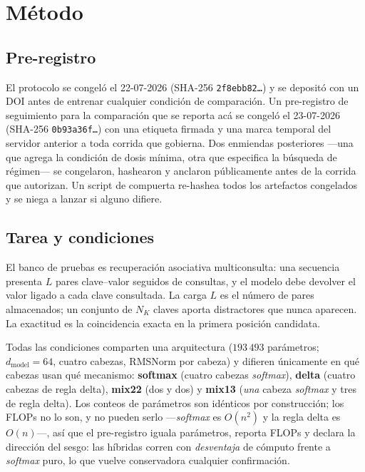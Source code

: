 \documentclass[jou,11pt,donotrepeattitle]{apa7}
\begin{document}
\section{M\'etodo}

\subsection{Pre-registro}

El protocolo se congel\'o el 22-07-2026 (SHA-256 \texttt{2f8ebb82\dots}) y se deposit\'o con un
DOI antes de entrenar cualquier condici\'on de comparaci\'on. Un pre-registro de seguimiento
para la comparaci\'on que se reporta ac\'a se congel\'o el 23-07-2026 (SHA-256
\texttt{0b93a36f\dots}) con una etiqueta firmada y una marca temporal del servidor anterior a
toda corrida que gobierna. Dos enmiendas posteriores ---una que agrega la condici\'on de dosis
m\'inima, otra que especifica la b\'usqueda de r\'egimen--- se congelaron, hashearon y anclaron
p\'ublicamente antes de la corrida que autorizan. Un script de compuerta re-hashea todos los
artefactos congelados y se niega a lanzar si alguno difiere.

\subsection{Tarea y condiciones}

El banco de pruebas es recuperaci\'on asociativa multiconsulta: una secuencia presenta $L$ pares
clave--valor seguidos de consultas, y el modelo debe devolver el valor ligado a cada clave
consultada. La carga $L$ es el n\'umero de pares almacenados; un conjunto de $N_K$ claves
aporta distractores que nunca aparecen. La exactitud es la coincidencia exacta en la primera
posici\'on candidata.

Todas las condiciones comparten una arquitectura ($193\,493$ par\'ametros;
$d_{\text{model}}=64$, cuatro cabezas, RMSNorm por cabeza) y difieren \'unicamente en qu\'e
cabezas usan qu\'e mecanismo:
\textbf{softmax} (cuatro cabezas \emph{softmax}), \textbf{delta} (cuatro cabezas de regla
delta), \textbf{mix22} (dos y dos) y \textbf{mix13} (\emph{una} cabeza \emph{softmax} y tres de
regla delta). Los conteos de par\'ametros son id\'enticos por construcci\'on; los FLOPs no lo
son, y no pueden serlo ---\emph{softmax} es $O(n^2)$ y la regla delta es $O(n)$---, as\'i que el
pre-registro iguala par\'ametros, reporta FLOPs y declara la direcci\'on del sesgo: las
h\'ibridas corren con \emph{desventaja} de c\'omputo frente a \emph{softmax} puro, lo que vuelve
conservadora cualquier confirmaci\'on.
\end{document}
